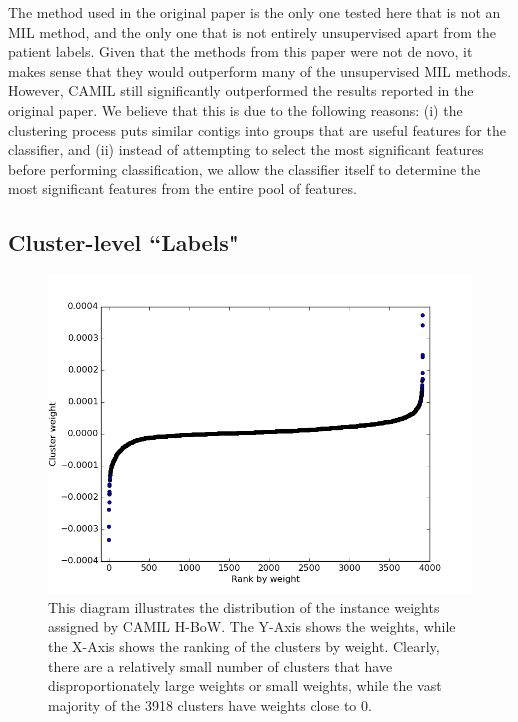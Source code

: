 The method used in the original paper is the only one tested here that is not an MIL method, and the only one that is not entirely unsupervised apart from the patient labels. Given that the methods from this paper were not de novo, it makes sense that they would outperform many of the unsupervised MIL methods. However, CAMIL still significantly outperformed the results reported in the original paper. We believe that this is due to the following reasons: (i) the clustering process puts similar contigs into groups that are useful features for the classifier, and (ii) instead of attempting to select the most significant features before performing classification, we allow the classifier itself to determine the most significant features from the entire pool of features.

\subsection{Cluster-level ``Labels"}

\begin{figure}[h]
\centering
\includegraphics[scale=0.4]{./instance-scatter.png}
\caption{This diagram illustrates the distribution of the instance weights assigned by CAMIL H-BoW. The Y-Axis shows the weights, while the X-Axis shows the ranking of the clusters by weight. Clearly, there are a relatively small number of clusters that have disproportionately large weights or small weights, while the vast majority of the 3918 clusters have weights close to 0.} \label{instance-scatter}
\end{figure}

